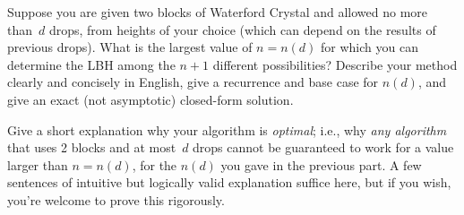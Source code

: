 \documentclass[11pt,addpoints]{exam}
\begin{document}
\begin{questions}
 

  \begin{parts}
    \bonuspart[2] Suppose you are given two blocks of Waterford Crystal and allowed no more than~$d$ drops, from heights of your choice (which can depend on the results of previous drops).
    What is the largest value of $n=n(d)$ for which you can determine the LBH among the $n+1$ different possibilities?
    Describe your method clearly and concisely in English, give a recurrence and base case for $n(d)$, and give an exact (not asymptotic) closed-form solution.

    \begin{solution}

    \end{solution}

    \bonuspart[1] Give a short explanation why your algorithm is \emph{optimal}; i.e., why \emph{any algorithm} that uses 2 blocks and at most~$d$ drops cannot be guaranteed to work for a value larger than $n=n(d)$, for the $n(d)$ you gave in the previous part.
    A few sentences of intuitive but logically valid explanation suffice here, but if you wish, you're welcome to prove this rigorously.

    \begin{solution}

    \end{solution}
  \end{parts}

\end{questions}
\end{document}
